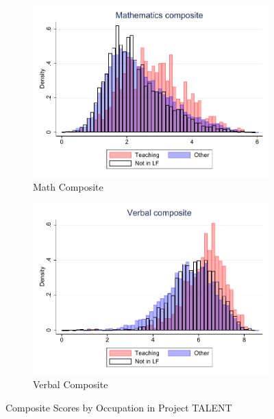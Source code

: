 \documentclass[onehalfspacing,11pt]{article}
\begin{document}
\begin{figure}
	\begin{subfigure}{0.49\textwidth}
		\includegraphics[width=\linewidth]{TALENT_Mathematics_occ.pdf}
		\caption{Math Composite} \label{fig:talentmath}
	\end{subfigure}
	\hspace*{\fill} %
	\begin{subfigure}{0.49\textwidth}
		\includegraphics[width=\linewidth]{TALENT_Verbal_occ.pdf}
		\caption{Verbal Composite} \label{fig:talentverb}
	\end{subfigure}
	\caption{Composite Scores by Occupation in Project TALENT} \label{fig:talent}
\end{figure}
\end{document}
